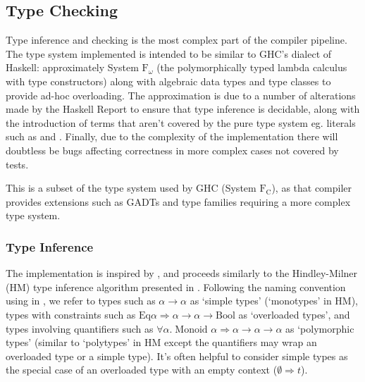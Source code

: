 \documentclass[dissertation.tex]{subfiles}
\begin{document}
{{{\begin{itemize}
{            }
            \end{itemize}

        }
    }
    \subsection{Type Checking}
    {

        Type inference and checking is the most complex part of the compiler pipeline. The type system implemented is
        intended to be similar to GHC's dialect of Haskell: approximately System \(\text{F}_\omega\) (the
        polymorphically typed lambda calculus with type constructors) along with algebraic data types and type classes
        to provide ad-hoc overloading. The approximation is due to a number of alterations made by the Haskell Report to
        ensure that type inference is decidable, along with the introduction of terms that aren't covered by the pure
        type system eg. literals such as  and . Finally, due to the complexity of the
        implementation there will doubtless be bugs affecting correctness in more complex cases not covered by tests.
        
        This is a subset of the type system used by GHC (System \(\text{F}_\text{C}\)), as that compiler provides
        extensions such as GADTs and type families requiring a more complex type system.



        \subsubsection{Type Inference}
        {

            The implementation is inspired by \cite{THIH}, and proceeds similarly to the Hindley-Milner (HM) type
            inference algorithm presented in \cite{HM-rules}. Following the naming convention using in \cite{THIH}, we
            refer to types such as \(\alpha\rightarrow\alpha\) as `simple types' (`monotypes' in HM), types with
            constraints such as \(\text{Eq}\alpha \Rightarrow \alpha\rightarrow\alpha\rightarrow\text{Bool}\) as
            `overloaded types', and types involving quantifiers such as \(\forall\alpha.\;\text{Monoid }\alpha
            \Rightarrow \alpha\rightarrow\alpha\rightarrow\alpha\) as `polymorphic types' (similar to `polytypes' in HM
            except the quantifiers may wrap an overloaded type or a simple type). It's often helpful to consider simple
            types as the special case of an overloaded type with an empty context (\(\emptyset \Rightarrow t\)).
            
}}}
\end{document}
